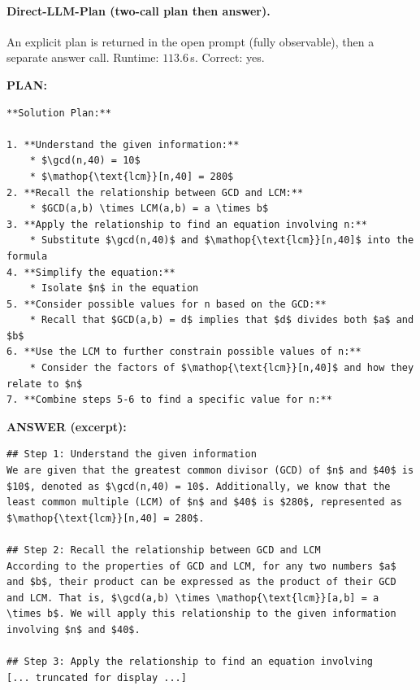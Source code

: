 \paragraph{Direct-LLM-Plan (two-call plan then answer).}
An explicit plan is returned in the open prompt (fully observable), then a separate answer call.
Runtime: $113.6$\,s. Correct: yes.

\noindent\textbf{PLAN:}
\begin{verbatim}
**Solution Plan:**

1. **Understand the given information:**
    * $\gcd(n,40) = 10$
    * $\mathop{\text{lcm}}[n,40] = 280$
2. **Recall the relationship between GCD and LCM:**
    * $GCD(a,b) \times LCM(a,b) = a \times b$
3. **Apply the relationship to find an equation involving n:**
    * Substitute $\gcd(n,40)$ and $\mathop{\text{lcm}}[n,40]$ into the formula
4. **Simplify the equation:**
    * Isolate $n$ in the equation
5. **Consider possible values for n based on the GCD:**
    * Recall that $GCD(a,b) = d$ implies that $d$ divides both $a$ and $b$
6. **Use the LCM to further constrain possible values of n:**
    * Consider the factors of $\mathop{\text{lcm}}[n,40]$ and how they relate to $n$
7. **Combine steps 5-6 to find a specific value for n:**
\end{verbatim}

\noindent\textbf{ANSWER (excerpt):}
\begin{verbatim}
## Step 1: Understand the given information
We are given that the greatest common divisor (GCD) of $n$ and $40$ is $10$, denoted as $\gcd(n,40) = 10$. Additionally, we know that the least common multiple (LCM) of $n$ and $40$ is $280$, represented as $\mathop{\text{lcm}}[n,40] = 280$.

## Step 2: Recall the relationship between GCD and LCM
According to the properties of GCD and LCM, for any two numbers $a$ and $b$, their product can be expressed as the product of their GCD and LCM. That is, $\gcd(a,b) \times \mathop{\text{lcm}}[a,b] = a \times b$. We will apply this relationship to the given information involving $n$ and $40$.

## Step 3: Apply the relationship to find an equation involving
[... truncated for display ...]
\end{verbatim}

\subsection{}
\label{app:determinism}


